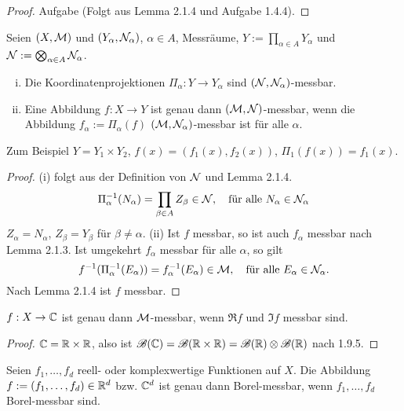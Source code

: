 \begin{proof}
 Aufgabe (Folgt aus Lemma 2.1.4 und Aufgabe 1.4.4).
\end{proof}

\clearpage

\begin{lem}
 Seien $(X,\mathcal{M})$ und $(Y_\alpha, \mathcal{N}_\alpha)$, $\alpha \in A$, Messräume, $Y := \prod_{\alpha \in A} Y_\alpha$ und $\mathcal{N} := \bigotimes_{\alpha \in A} \mathcal{N}_\alpha$.
 \begin{enumerate}[(i)]
  \item Die Koordinatenprojektionen $\Pi_\alpha: Y \to Y_\alpha$ sind $(\mathcal{N},\mathcal{N}_\alpha)$-messbar.
  \item Eine Abbildung $f: X \to Y$ ist genau dann $(\mathcal{M},\mathcal{N})$-messbar, wenn die Abbildung $f_\alpha := \Pi_\alpha(f)$ $(\mathcal{M},\mathcal{N}_\alpha)$-messbar ist für alle $\alpha$.
 \end{enumerate}
\end{lem}

Zum Beispiel $Y = Y_1 \times Y_2$, $f(x) = ( f_1(x), f_2(x) )$, $\Pi_1(f(x)) = f_1(x)$.

\begin{proof}
 (i) folgt aus der Definition von $\mathcal{N}$ und Lemma 2.1.4.
 \[ \Pi^{-1}_\alpha ( N_\alpha ) = \prod_{\beta \in A} Z_\beta \in \mathcal{N}, \quad \text{für alle } N_\alpha \in \mathcal{N}_\alpha \]
 $Z_\alpha = N_\alpha$, $Z_\beta = Y_\beta$ für $\beta \ne \alpha$.
 (ii) Ist $f$ messbar, so ist auch $f_\alpha$ messbar nach Lemma 2.1.3. Ist umgekehrt $f_\alpha$ messbar für alle $\alpha$, so gilt
 \[ f^{-1}( \Pi_\alpha^{-1}( E_\alpha ) ) = f_\alpha^{-1} (E_\alpha) \in \mathcal{M}, \quad \text{für alle } E_\alpha \in \mathcal{N}_\alpha. \]
 Nach Lemma 2.1.4 ist $f$ messbar.
\end{proof}

\begin{folg}
 $f: X \to \mathbb{C}$ ist genau dann $\mathcal{M}$-messbar, wenn $\Re f$ und $\Im f$ messbar sind.
\end{folg}

\begin{proof}
 $\mathbb{C} = \mathbb{R} \times \mathbb{R}$, also ist $\mathscr{B}(\mathbb{C}) = \mathscr{B}( \mathbb{R} \times \mathbb{R} ) = \mathscr{B}( \mathbb{R} ) \otimes \mathscr{B}(\mathbb{R})$ nach 1.9.5.
\end{proof}

\begin{folg}
 Seien $f_1, \ldots, f_d$ reell- oder komplexwertige Funktionen auf $X$. Die Abbildung $f := (f_1, \ldots, f_d) \in \mathbb{R}^d$ bzw. $\mathbb{C}^d$ ist genau dann Borel-messbar, wenn $f_1, \ldots, f_d$ Borel-messbar sind.
\end{folg}

